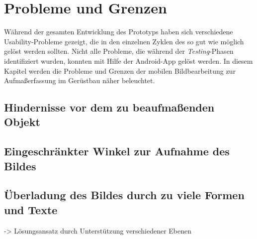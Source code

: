\chapter{Probleme und Grenzen}
Während der gesamten Entwicklung des Prototyps haben sich verschiedene Usability-Probleme gezeigt, die in den einzelnen Zyklen des \hcdp{} so gut wie möglich gelöst werden sollten.
Nicht alle Probleme, die während der \emph{Testing}-Phasen identifiziert wurden, konnten mit Hilfe der Android-App gelöst werden.
In diesem Kapitel werden die Probleme und Grenzen der mobilen Bildbearbeitung zur Aufmaßerfassung im Gerüstbau näher beleuchtet.

\section{Hindernisse vor dem zu beaufmaßenden Objekt}

\section{Eingeschränkter Winkel zur Aufnahme des Bildes}

\section{Überladung des Bildes durch zu viele Formen und Texte}
-> Lösungsansatz durch Unterstützung verschiedener Ebenen

